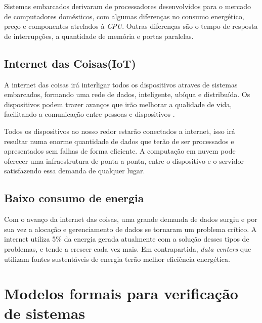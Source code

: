  

Sistemas embarcados derivaram de processadores desenvolvidos para o mercado de computadores domésticos, com algumas diferenças no consumo energético, preço e componentes atrelados à \textit{CPU}. Outras diferenças são o tempo de resposta de interrupções, a quantidade de memória e portas paralelas.
\cite{schlett:1998}


\subsection{Internet das Coisas(IoT)}

A internet das coisas irá interligar todos os dispositivos atraves de sistemas embarcados, formando uma rede de dados, inteligente, ubíqua e distribuída. Os dispositivos podem trazer avanços que irão melhorar a qualidade de vida, facilitando a comunicação entre pessoas e dispositivos \cite{xia:2012}.

Todos os dispositivos ao nosso redor estarão conectados a internet, isso irá resultar numa enorme quantidade de dados que terão de ser processados e apresentados sem falhas de forma eficiente. A computação em nuvem pode oferecer uma infraestrutura  de ponta a ponta, entre o dispositivo e o servidor satisfazendo essa demanda de qualquer lugar.\cite{Gubbi:2013} 

\subsection{Baixo consumo de energia}
Com o avanço da internet das coisas, uma grande demanda de dados surgiu e por sua vez a alocação e gerenciamento de dados se tornaram um problema crítico. A internet utiliza 5\% da energia gerada atualmente com a solução desses tipos de problemas, e tende a crescer cada vez mais. Em contrapartida, \textit{data centers} que utilizam fontes sustentáveis de energia terão melhor eficiência energética.\cite{Gubbi:2013} 

\section{Modelos formais para verificação de sistemas}
 
